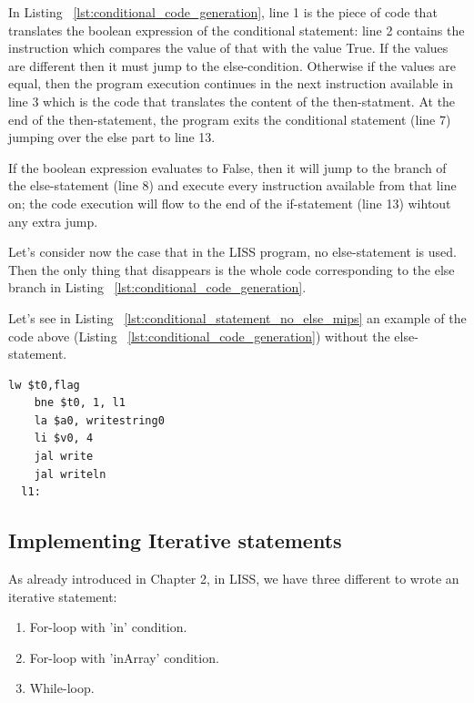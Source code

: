 \documentclass[
  oneside,
  11pt, a4paper,
  footinclude=true,
  headinclude=true,
  cleardoublepage=empty
]{scrbook}
\begin{document}
In Listing ~\ref{lst:conditional_code_generation}, line 1 is the piece of code that translates the boolean expression of the conditional statement: line 2 contains the instruction which compares the value of that with the value True. If the values are different then it must jump to the else-condition. Otherwise if the values are equal, then the program execution continues in the next instruction available in line 3 which is the code that translates the content of the then-statment. At the end of the then-statement, the program exits the conditional statement (line 7) jumping over the else part to line 13.

If the boolean expression evaluates to False, then it will jump to the branch of the else-statement (line 8) and execute every instruction available from that line on; the code execution will flow to the end of the if-statement (line 13) wihtout any extra jump.

Let's consider now the case that in the LISS program, no else-statement is used. Then the only thing that disappears is the whole code corresponding to the else branch in Listing ~\ref{lst:conditional_code_generation}.

Let's see in Listing ~\ref{lst:conditional_statement_no_else_mips} an example of the code above (Listing ~\ref{lst:conditional_code_generation}) without the else-statement.

\begin{lstlisting}[caption={Code generated for conditional statements without an else-statement in MIPS},label={lst:conditional_statement_no_else_mips}]
    lw $t0,flag		
    bne $t0, 1, l1		
    la $a0, writestring0
    li $v0, 4
    jal write		
    jal writeln				
  l1:
\end{lstlisting}

\subsection{Implementing Iterative statements}

As already introduced in Chapter 2, in LISS, we have three different to wrote an iterative statement:

\begin{enumerate}
\item For-loop with 'in' condition.
\item For-loop with 'inArray' condition.
\item While-loop.
\end{enumerate}
\end{document}

